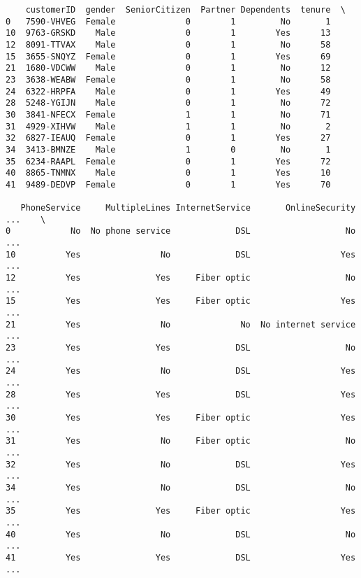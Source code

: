 \documentclass[11pt]{article}
\begin{document}
    
    \begin{verbatim}
    customerID  gender  SeniorCitizen  Partner Dependents  tenure  \
0   7590-VHVEG  Female              0        1         No       1   
10  9763-GRSKD    Male              0        1        Yes      13   
12  8091-TTVAX    Male              0        1         No      58   
15  3655-SNQYZ  Female              0        1        Yes      69   
21  1680-VDCWW    Male              0        1         No      12   
23  3638-WEABW  Female              0        1         No      58   
24  6322-HRPFA    Male              0        1        Yes      49   
28  5248-YGIJN    Male              0        1         No      72   
30  3841-NFECX  Female              1        1         No      71   
31  4929-XIHVW    Male              1        1         No       2   
32  6827-IEAUQ  Female              0        1        Yes      27   
34  3413-BMNZE    Male              1        0         No       1   
35  6234-RAAPL  Female              0        1        Yes      72   
40  8865-TNMNX    Male              0        1        Yes      10   
41  9489-DEDVP  Female              0        1        Yes      70   

   PhoneService     MultipleLines InternetService       OnlineSecurity  ...    \
0            No  No phone service             DSL                   No  ...     
10          Yes                No             DSL                  Yes  ...     
12          Yes               Yes     Fiber optic                   No  ...     
15          Yes               Yes     Fiber optic                  Yes  ...     
21          Yes                No              No  No internet service  ...     
23          Yes               Yes             DSL                   No  ...     
24          Yes                No             DSL                  Yes  ...     
28          Yes               Yes             DSL                  Yes  ...     
30          Yes               Yes     Fiber optic                  Yes  ...     
31          Yes                No     Fiber optic                   No  ...     
32          Yes                No             DSL                  Yes  ...     
34          Yes                No             DSL                   No  ...     
35          Yes               Yes     Fiber optic                  Yes  ...     
40          Yes                No             DSL                   No  ...     
41          Yes               Yes             DSL                  Yes  ...     


\end{verbatim}
\end{document}
